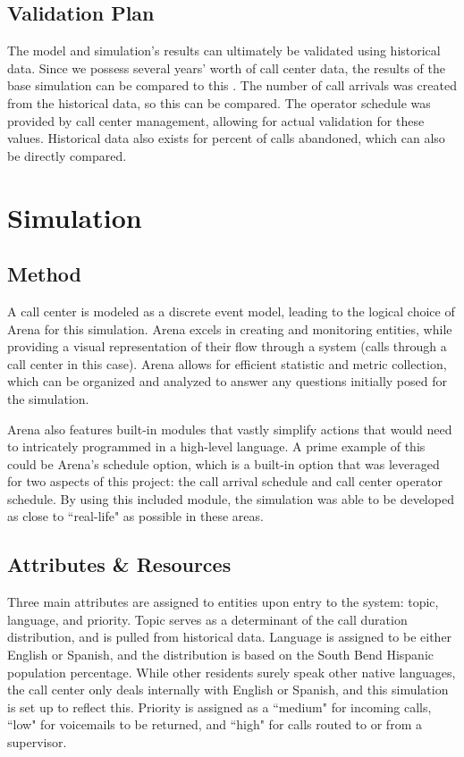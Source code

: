 \documentclass[12pt,twocolumn]{article}
\begin{document}
	
	\subsection{Validation Plan}
	
The model and simulation's results can ultimately be validated using historical data.  Since we possess several years' worth of call center data, the results of the base simulation can be compared to this .  The number of call arrivals was created from the historical data, so this can be compared.  The operator schedule was provided by call center management, allowing for actual validation for these values.  Historical data also exists for percent of calls abandoned, which can also be directly compared.
	
\section{Simulation}

	\subsection{Method}
	
A call center is modeled as a discrete event model, leading to the logical choice of Arena for this simulation.  Arena excels in creating and monitoring entities, while providing a visual representation of their flow through a system (calls through a call center in this case).  Arena allows for efficient statistic and metric collection, which can be organized and analyzed to answer any questions initially posed for the simulation.

\par

Arena also features built-in modules that vastly simplify actions that would need to intricately programmed in a high-level language.  A prime example of this could be Arena's schedule option, which is a built-in option that was leveraged for two aspects of this project:  the call arrival schedule and call center operator schedule.  By using this included module, the simulation was able to be developed as close to ``real-life" as possible in these areas.
	
	\subsection{Attributes \& Resources}

Three main attributes are assigned to entities upon entry to the system:  topic, language, and priority.  Topic serves as a determinant of the call duration distribution, and is pulled from historical data.  Language is assigned to be either English or Spanish, and the distribution is based on the South Bend Hispanic population percentage.  While other residents surely speak other native languages, the call center only deals internally with English or Spanish, and this simulation is set up to reflect this.  Priority is assigned as a ``medium" for incoming calls, ``low" for voicemails to be returned, and ``high" for calls routed to or from a supervisor.
\end{document}

